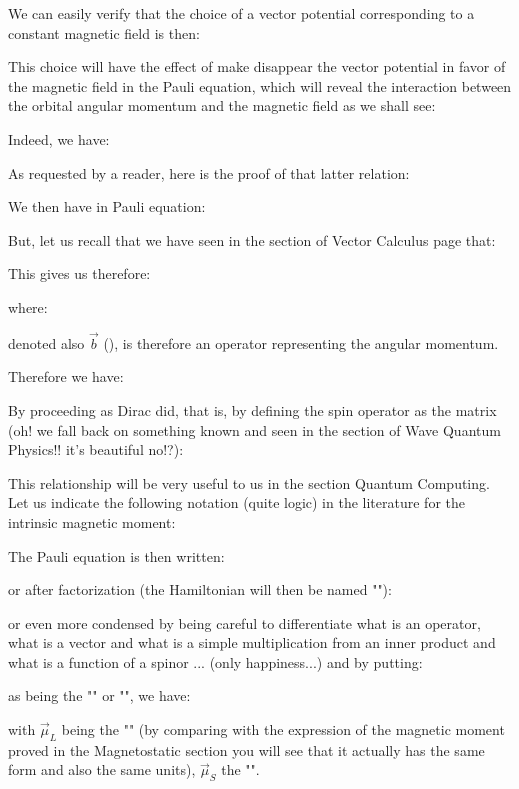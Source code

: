 	We can easily verify that the choice of a vector potential corresponding to a constant magnetic field is then:
	
	This choice will have the effect of make disappear the vector potential in favor of the magnetic field in the Pauli equation, which will reveal the interaction between the orbital angular momentum and the magnetic field as we shall see:

	Indeed, we have:
	
	As requested by a reader, here is the proof of that latter relation:
	
	We then have in Pauli equation:
	
	But, let us recall that we have seen in the section of Vector Calculus page \pageref{cross product} that:
	
	This gives us therefore:
	
	where:
	
	denoted also $\vec{b}$ (), is therefore an operator representing the angular momentum.

	Therefore we have:
	
	By proceeding as Dirac did, that is, by defining the spin operator as the matrix (oh! we fall back on something known and seen in the section of Wave Quantum Physics!! it's beautiful no!?)\label{emerging electron spin value}:
	
	This relationship will be very useful to us in the section Quantum Computing. Let us indicate the following notation (quite logic) in the literature for the intrinsic magnetic moment:
	
	The Pauli equation is then written:
	
	or after factorization (the Hamiltonian will then be named "\label{pauli hamiltonian for a constant direction magnetic field}"):
	
	or even more condensed by being careful to differentiate what is an operator, what is a vector and what is a simple multiplication from an inner product and what is a function of a spinor ... (only happiness...) and by putting:
	
	as being the "" or "\label{gyromagnetic factor}", we have:
	
	with $\vec{\mu}_L$ being the "" (by comparing with the expression of the magnetic moment proved in the Magnetostatic section you will see that it actually has the same form and also the same units), $\vec{\mu}_S$ the "".

